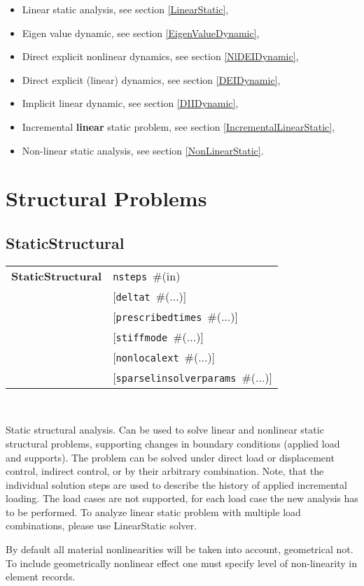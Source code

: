 \documentclass[a4paper]{report}
\newcommand{\param}[1]{\texttt{#1}} %
\newcommand{\optional}[1]{[#1]} %
\newcommand{\field}[2]{\param{#1}~\#{\tiny(#2)}} %
\newcommand{\optField}[2]{\optional{\field{#1}{#2}}}
\newcommand{\entKeywordInst}[1]{\textbf{#1}} %
\newenvironment{record}[1][]{\begin{tabular}{|ll}}{\end{tabular}\\}
\newcommand{\recentry}[2]{{#1}&{#2}\\}
\newcounter{rcc}
\newenvironment{record}[1][\textwidth]{\setcounter{rcc}{0}\rowcolors{1}{lightgray}{lightgray}\tabularx{#1}{llR} \hline}
               {\endtabularx}
\newcommand{\recentry}[2]{\ifthenelse{\value{rcc}>0}{$\backslash$ \\}{\setcounter{rcc}{1}}{#1}&{#2}&}
\begin{document}
\begin{itemize}
\item Linear static analysis, see section \ref{LinearStatic},
\item Eigen value dynamic, see section \ref{EigenValueDynamic},
\item Direct explicit  nonlinear dynamics, see section
\ref{NlDEIDynamic},
\item Direct explicit (linear) dynamics, see section \ref{DEIDynamic},
\item Implicit linear dynamic, see section \ref{DIIDynamic},
\item Incremental \textbf{linear} static problem, see section \ref{IncrementalLinearStatic},
\item Non-linear static analysis, see section \ref{NonLinearStatic}.
\end{itemize}

\section{Structural Problems}
\subsection{StaticStructural}
\label{StaticStructural}
\begin{record}
  \recentry{\entKeywordInst{StaticStructural}}{\field{nsteps}{in}}
  \recentry{}{\optField{deltat}{...}}
  \recentry{}{\optField{prescribedtimes}{...}}
  \recentry{}{\optField{stiffmode}{...}}
  \recentry{}{\optField{nonlocalext}{...}}
  \recentry{}{\optField{sparselinsolverparams}{...}}
\end{record}

Static structural analysis. Can be used to solve linear and nonlinear static structural problems, supporting changes in boundary conditions (applied load and supports).
The problem can be solved under direct load or displacement control, indirect control, or by
their arbitrary combination.
Note, that the individual solution steps are used to describe the history of applied incremental loading. The load cases are not supported, for each load case the new analysis has to be performed. To analyze linear static problem with multiple load combinations, please use LinearStatic solver.

By default all material nonlinearities will be taken into account, geometrical not.
To include geometrically nonlinear effect one must specify level of non-linearity in element records.
\end{document}
